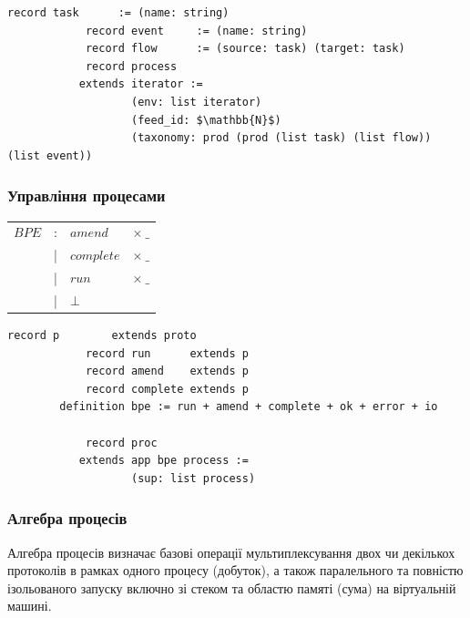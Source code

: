\documentclass[11pt,oneside]{article}
\begin{document}
\begin{center}
\begin{lstlisting}[mathescape=true]
            record task      := (name: string)
            record event     := (name: string)
            record flow      := (source: task) (target: task)
            record process
           extends iterator :=
                   (env: list iterator)
                   (feed_id: $\mathbb{N}$)
                   (taxonomy: prod (prod (list task) (list flow)) (list event))
\end{lstlisting}
\end{center}

   \subsubsection*{Управління процесами}

\begin{center}
\begin{tabular}{llll}
 $BPE$      &:& $amend$       & $\times\ \_$      \\
            &|& $complete$    & $\times\ \_$         \\
            &|& $run$         & $\times\ \_$          \\
            &|& $\bot$        &
\end{tabular}
\end{center}

\begin{center}
\begin{lstlisting}[mathescape=true]
            record p        extends proto
            record run      extends p
            record amend    extends p
            record complete extends p
        definition bpe := run + amend + complete + ok + error + io

            record proc
           extends app bpe process :=
                   (sup: list process)

\end{lstlisting}
\end{center}

  \subsubsection*{Алгебра процесів}

  Алгебра процесів визначає базові операції мультиплексування двох чи декількох
  протоколів в рамках одного процесу (добуток), а також паралельного та повністю
  ізольованого запуску включно зі стеком та областю памяті (сума) на
  віртуальній машині.
\end{document}
